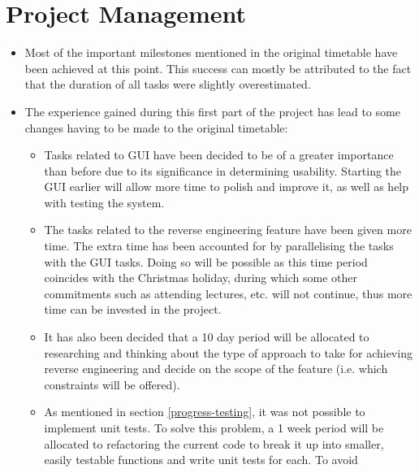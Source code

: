 \documentclass{article}
\begin{document}
	
	
	
	\section{Project Management}
	\begin{itemize}
		\item Most of the important milestones mentioned in the original timetable have been achieved at this point. This success can mostly be attributed to the fact that the duration of all tasks were slightly overestimated.
		\item The experience gained during this first part of the project has lead to some changes having to be made to the original timetable:
		\begin{itemize}
			\item Tasks related to GUI have been decided to be of a greater importance than before due to its significance in determining usability. Starting the GUI earlier will allow more time to polish and improve it, as well as help with testing the system.
			\item The tasks related to the reverse engineering feature have been given more time. The extra time has been accounted for by parallelising the tasks with the GUI tasks. Doing so will be possible as this time period coincides with the Christmas holiday, during which some other commitments such as attending lectures, etc. will not continue, thus more time can be invested in the project.
			\item It has also been decided that a 10 day period will be allocated to researching and thinking about the type of approach to take for achieving reverse engineering and decide on the scope of the feature (i.e. which constraints will be offered).
			\item As mentioned in section \ref{progress-testing}, it was not possible to implement unit tests. To solve this problem, a 1 week period will be allocated to refactoring the current code to break it up into smaller, easily testable functions and write unit tests for each. To avoid 
			
		\end{itemize}
		
	\end{itemize}
	
\end{document}
